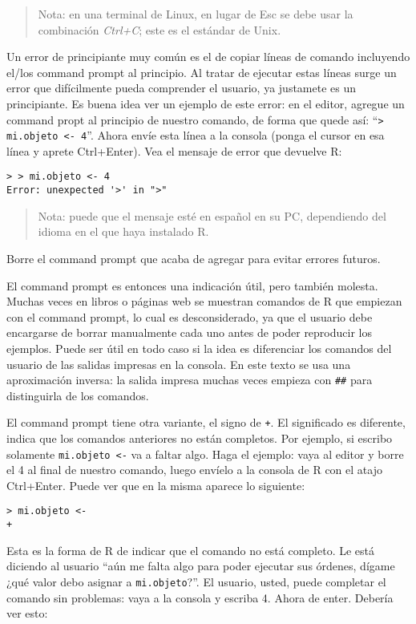 \documentclass[]{article}
\begin{document}
\begin{quote}
Nota: en una terminal de Linux, en lugar de Esc se debe usar la
combinación \emph{Ctrl+C}; este es el estándar de Unix.

\end{quote}
Un error de principiante muy común es el de copiar líneas de comando
incluyendo el/los command prompt al principio. Al tratar de ejecutar
estas líneas surge un error que difícilmente pueda comprender el
usuario, ya justamete es un principiante. Es buena idea ver un ejemplo
de este error: en el editor, agregue un command propt al principio de
nuestro comando, de forma que quede así:
``\texttt{\textgreater{} mi.objeto \textless{}- 4}''. Ahora envíe esta
línea a la consola (ponga el cursor en esa línea y aprete Ctrl+Enter).
Vea el mensaje de error que devuelve R:

\begin{verbatim}
> > mi.objeto <- 4
Error: unexpected '>' in ">"
\end{verbatim}
\begin{quote}
Nota: puede que el mensaje esté en español en su PC, dependiendo del
idioma en el que haya instalado R.

\end{quote}
Borre el command prompt que acaba de agregar para evitar errores
futuros.

El command prompt es entonces una indicación útil, pero también molesta.
Muchas veces en libros o páginas web se muestran comandos de R que
empiezan con el command prompt, lo cual es desconsiderado, ya que el
usuario debe encargarse de borrar manualmente cada uno antes de poder
reproducir los ejemplos. Puede ser útil en todo caso si la idea es
diferenciar los comandos del usuario de las salidas impresas en la
consola. En este texto se usa una aproximación inversa: la salida
impresa muchas veces empieza con \texttt{\#\#} para distinguirla de los
comandos.

El command prompt tiene otra variante, el signo de \texttt{+}. El
significado es diferente, indica que los comandos anteriores no están
completos. Por ejemplo, si escribo solamente
\texttt{mi.objeto \textless{}-} va a faltar algo. Haga el ejemplo: vaya
al editor y borre el 4 al final de nuestro comando, luego envíelo a la
consola de R con el atajo Ctrl+Enter. Puede ver que en la misma aparece
lo siguiente:

\begin{verbatim}
> mi.objeto <-
+
\end{verbatim}
Esta es la forma de R de indicar que el comando no está completo. Le
está diciendo al usuario ``aún me falta algo para poder ejecutar sus
órdenes, dígame ¿qué valor debo asignar a \texttt{mi.objeto}?''. El
usuario, usted, puede completar el comando sin problemas: vaya a la
consola y escriba 4. Ahora de enter. Debería ver esto:
\end{document}
